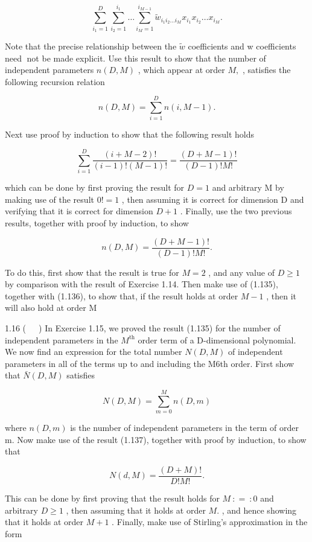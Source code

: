 \documentclass[
  10
]{article}
\begin{document}
\[
\sum_ {i _ {1} = 1} ^ {D} \sum_ {i _ {2} = 1} ^ {i _ {1}} \dots \sum_ {i _ {M} = 1} ^ {i _ {M - 1}} \widetilde {w} _ {i _ {1} i _ {2} \ldots i _ {M}} x _ {i _ {1}} x _ {i _ {2}} \dots x _ {i _ {M}}.\tag{1.134}
\]

Note that the precise relationship between the \(\widetilde { w }\)
coefficients and w coefficients need not be made explicit. Use this
result to show that the number of independent parameters \(n ( D , M )\)
, which appear at order \(M ,\) , satisfies the following recursion
relation

\[
n (D, M) = \sum_ {i = 1} ^ {D} n (i, M - 1).\tag{1.135}
\]

Next use proof by induction to show that the following result holds

\[
\sum_ {i = 1} ^ {D} \frac {(i + M - 2) !}{(i - 1) ! (M - 1) !} = \frac {(D + M - 1) !}{(D - 1) ! M !}\tag{1.136}
\]

which can be done by first proving the result for \(D = 1\) and
arbitrary M by making use of the result \(0 ! = 1\) , then assuming it
is correct for dimension D and verifying that it is correct for
dimension \(D + 1\) . Finally, use the two previous results, together
with proof by induction, to show

\[
n (D, M) = \frac {(D + M - 1) !}{(D - 1) ! M !}.\tag{1.137}
\]

To do this, first show that the result is true for \(M = 2\) , and any
value of \(D \geqslant 1\) by comparison with the result of Exercise
1.14. Then make use of (1.135), together with (1.136), to show that, if
the result holds at order \(M - 1\) , then it will also hold at order M

1.16 (  ) In Exercise 1.15, we proved the result (1.135) for the number
of independent parameters in the \(M ^ { \mathrm { t h } }\) order term
of a D-dimensional polynomial. We now find an expression for the total
number \(N ( D , M )\) of independent parameters in all of the terms up
to and including the M6th order. First show that
\(\bar { N } ( D , M )\) satisfies

\[
N (D, M) = \sum_ {m = 0} ^ {M} n (D, m)\tag{1.138}
\]

where \(n ( D , m )\) is the number of independent parameters in the
term of order m. Now make use of the result (1.137), together with proof
by induction, to show that

\[
N (d, M) = \frac {(D + M) !}{D !   M !}.\tag{1.139}
\]

This can be done by first proving that the result holds for
\(M \ : = \ : 0\) and arbitrary \(D \geqslant 1\) , then assuming that
it holds at order \(M .\) , and hence showing that it holds at order
\(M + 1\) . Finally, make use of Stirling's approximation in the form
\end{document}
